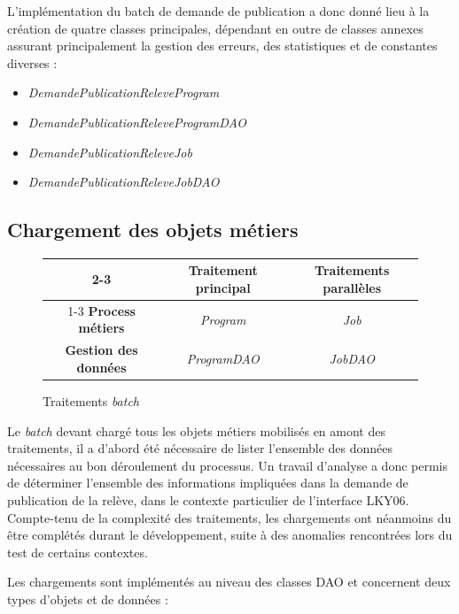 \documentclass[a4paper, 12pt]{report}
\begin{document}
L'implémentation du batch de demande de publication a donc donné lieu à la création de quatre classes principales, dépendant en outre de classes annexes assurant principalement la gestion des erreurs, des statistiques et de constantes diverses :\\

\begin{itemize}
  \item \textit{DemandePublicationReleveProgram}
  \item \textit{DemandePublicationReleveProgramDAO}
  \item \textit{DemandePublicationReleveJob}
  \item \textit{DemandePublicationReleveJobDAO}
\end{itemize}

\subsection{Chargement des objets métiers}

\begin{figure}[t]
  \begin{center}
    \begin{tabular}{|c|c|c|}
      \cline{2-3}
      \multicolumn{1}{ c| }{} & \textbf{Traitement principal} & \textbf{Traitements parallèles} \\
      \cline{1-3}
      \textbf{Process métiers} & \textit{Program} & \textit{Job} \\ 
      \hline
      \textbf{Gestion des données} & \textit{ProgramDAO} & \textit{JobDAO} \\
      \hline
    \end{tabular}
    \caption{Traitements \textit{batch}}
    \label{division}
  \end{center}
\end{figure}

Le \textit{batch} devant chargé tous les objets métiers mobilisés en amont des traitements, il a d'abord été nécessaire de lister l'ensemble des données nécessaires au bon déroulement du processus. Un travail d'analyse a donc permis de déterminer l'ensemble des informations impliquées dans la demande de publication de la relève, dans le contexte particulier de l'interface LKY06. Compte-tenu de la complexité des traitements, les chargements ont néanmoins du être complétés durant le développement, suite à des anomalies rencontrées lors du test de certains contextes.

Les chargements sont implémentés au niveau des classes DAO et concernent deux types d'objets et de données :\\
\end{document}
